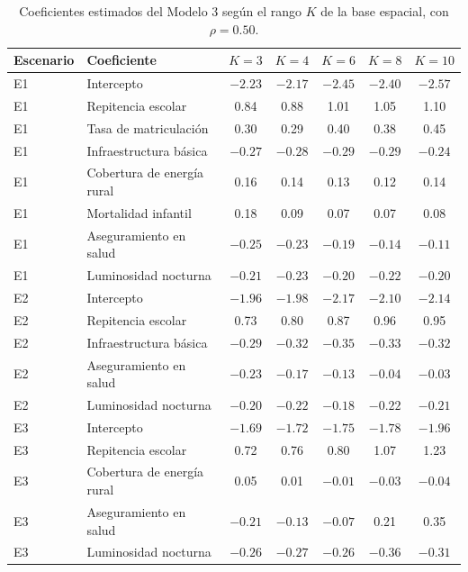 \begin{table}[!htbp]
\centering
\footnotesize
\caption{Coeficientes estimados del Modelo 3 según el rango $K$ de la base espacial, con $\rho=0.50$.}
\label{tab:coef-K}
\renewcommand{\arraystretch}{1.15}
\begin{tabular}{l l c c c c c}
\hline
Escenario & Coeficiente & $K=3$ & $K=4$ & $K=6$ & $K=8$ & $K=10$ \\
\hline
E1 & Intercepto & $-2.23$ & $-2.17$ & $-2.45$ & $-2.40$ & $-2.57$ \\
E1 & Repitencia escolar & 0.84 & 0.88 & 1.01 & 1.05 & 1.10 \\
E1 & Tasa de matriculación & 0.30 & 0.29 & 0.40 & 0.38 & 0.45 \\
E1 & Infraestructura básica & $-0.27$ & $-0.28$ & $-0.29$ & $-0.29$ & $-0.24$ \\
E1 & Cobertura de energía rural & 0.16 & 0.14 & 0.13 & 0.12 & 0.14 \\
E1 & Mortalidad infantil & 0.18 & 0.09 & 0.07 & 0.07 & 0.08 \\
E1 & Aseguramiento en salud & $-0.25$ & $-0.23$ & $-0.19$ & $-0.14$ & $-0.11$ \\
E1 & Luminosidad nocturna & $-0.21$ & $-0.23$ & $-0.20$ & $-0.22$ & $-0.20$ \\
E2 & Intercepto & $-1.96$ & $-1.98$ & $-2.17$ & $-2.10$ & $-2.14$ \\
E2 & Repitencia escolar & 0.73 & 0.80 & 0.87 & 0.96 & 0.95 \\
E2 & Infraestructura básica & $-0.29$ & $-0.32$ & $-0.35$ & $-0.33$ & $-0.32$ \\
E2 & Aseguramiento en salud & $-0.23$ & $-0.17$ & $-0.13$ & $-0.04$ & $-0.03$ \\
E2 & Luminosidad nocturna & $-0.20$ & $-0.22$ & $-0.18$ & $-0.22$ & $-0.21$ \\
E3 & Intercepto & $-1.69$ & $-1.72$ & $-1.75$ & $-1.78$ & $-1.96$ \\
E3 & Repitencia escolar & 0.72 & 0.76 & 0.80 & 1.07 & 1.23 \\
E3 & Cobertura de energía rural & 0.05 & 0.01 & $-0.01$ & $-0.03$ & $-0.04$ \\
E3 & Aseguramiento en salud & $-0.21$ & $-0.13$ & $-0.07$ & 0.21 & 0.35 \\
E3 & Luminosidad nocturna & $-0.26$ & $-0.27$ & $-0.26$ & $-0.36$ & $-0.31$ \\
\hline
\end{tabular}
\end{table}

